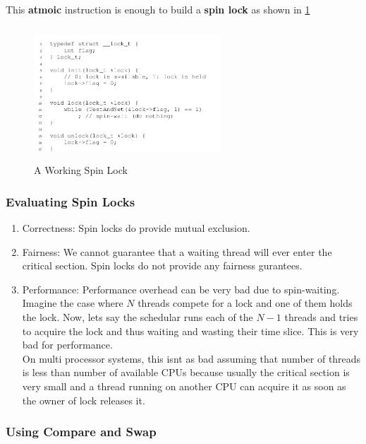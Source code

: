 This \textbf{atmoic} instruction is enough to build a \textbf{spin lock} as
shown in \ref{283}

\begin{figure}[h!]
    \label{283}
    \begin{center}
        \includegraphics[width=7cm, height=5cm]{img/283.png}
        \caption{A Working Spin Lock}
    \end{center}
\end{figure}

\subsubsection{Evaluating Spin Locks}

\begin{enumerate}
    \item Correctness: Spin locks do provide mutual exclusion.
    \item Fairness: We cannot guarantee that a waiting thread will ever enter
        the critical section. Spin locks do not provide any fairness gurantees.
    \item Performance: Performance overhead can be very bad due to spin-waiting.
        Imagine the case where $N$ threads compete for a lock and one of them holds
        the lock. Now, lets say the schedular runs each of the $N - 1$ threads
        and tries to acquire the lock and thus waiting and wasting their time
        slice. This is very bad for performance.\\

        On multi processor systems, this isnt as bad assuming that number of
        threads is less than number of available CPUs because usually the critical
        section is very small and a thread running on another CPU can acquire
        it as soon as the owner of lock releases it.
\end{enumerate}

\subsubsection{Using Compare and Swap}

